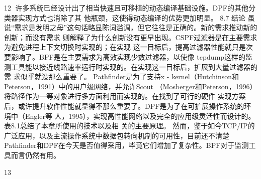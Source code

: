                                                          12
许多系统已经设计出了相当快速且可移植的动态编译基础设施。DPF的其他分类器实现方式也消除了其
他瓶颈，这使得动态编译的优势更加明显。
8.7 结论
虽说“需求是发明之母”这句话略显陈词滥调，但它往往是正确的。新的需求推动新的创新；而没有需求
则解释了为什么创新没有更早出现。CSPF过滤器是在主要需求为避免进程上下文切换时实现的；在实现
这一目标后，提高过滤器性能就只是次要影响了。BPF是在主要需求为高效实现少数过滤器，以使像
tcpdump这样的监测工具能以接近线路速率运行时实现的。在实现这一目标后，扩展到大量过滤器的需
求似乎就没那么重要了。
Pathfinder是为了支持x - kernel（Hutchinson和Peterson，1991）中的用户级网络，并允许Scout
（Mosberger和Peterson，1996）将路径作为一等对象进行多方面利用而实现的。在找到了可行的硬件
实现方案后，或许提升软件性能就显得不那么重要了。DPF是为了在可扩展操作系统的环境中（Engler等
人，1995），实现高性能网络以及完全的应用级灵活性而设计的。表8.1总结了本章所使用的技术以及相
关的主要原理。
然而，鉴于如今TCP/IP的广泛应用，以及主流操作系统中数据包转向机制的可用性，目前还不清楚
Pathfinder和DPF在今天是否值得采用，毕竟它们增加了复杂性。BPF对于监测工具而言仍然有用。




                                                                 13
